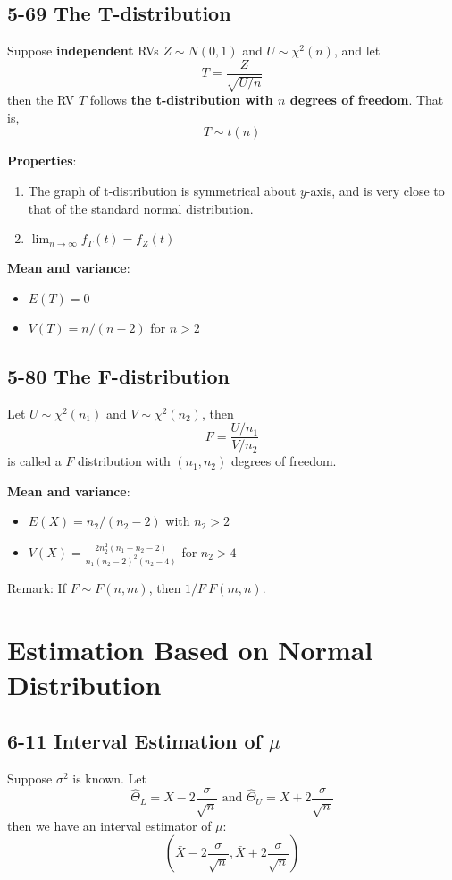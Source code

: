 \documentclass[12pt,landscape]{article}
\begin{document}
\begin{multicols}{3}
    \subsection{5-69 The T-distribution}
    Suppose \textbf{independent} RVs $Z \sim N(0,1)$ and $U \sim \chi^2(n)$, and let
        $$ T = \frac{Z}{\sqrt{U/n}} $$
    then the RV $T$ follows \textbf{the t-distribution with $n$ degrees of freedom}. That is,
        $$ T \sim t(n) $$
    
    \textbf{Properties}:
    \begin{enumerate}
        \item The graph of t-distribution is symmetrical about $y$-axis, and is very close to that
            of the standard normal distribution.
        \item $\lim_{n \to \infty} f_T(t) = f_Z(t)$
    \end{enumerate}

    \textbf{Mean and variance}:
    \begin{itemize}
        \item $E(T) = 0$
        \item $V(T) = n/(n-2)$ for $n > 2$
    \end{itemize}

    \subsection{5-80 The F-distribution}
    Let $U \sim \chi^2(n_1)$ and $V \sim \chi^2(n_2)$, then
        $$ F = \frac{U/n_1}{V/n_2} $$
    is called a $F$ distribution with $(n_1,n_2)$ degrees of freedom.

    \textbf{Mean and variance}:
    \begin{itemize}
        \item $E(X) = n_2/(n_2 - 2)$ with $n_2 > 2$
        \item $V(X) = \frac{2n_2^2(n_1 + n_2 - 2)}{n_1(n_2-2)^2(n_2-4)}$ for $n_2 > 4$
    \end{itemize}

    Remark: If $F \sim F(n,m)$, then $1/F ~ F(m,n)$.


    \section{Estimation Based on Normal Distribution}

    \subsection{6-11 Interval Estimation of $\mu$}
    Suppose $\sigma^2$ is known. Let
        $$ \hat{\Theta}_L = \bar{X} - 2\frac{\sigma}{\sqrt{n}} \text{ and } \hat{\Theta}_U = \bar{X} + 2\frac{\sigma}{\sqrt{n}} $$
    then we have an interval estimator of $\mu$:
        $$ (\bar{X} - 2\frac{\sigma}{\sqrt{n}}, \bar{X} + 2\frac{\sigma}{\sqrt{n}}) $$
    

\end{multicols}
\end{document}
